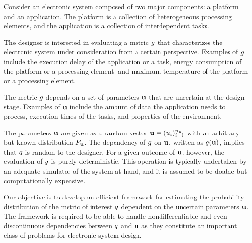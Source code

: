 Consider an electronic system composed of two major components: a platform and
an application. The platform is a collection of heterogeneous processing
elements, and the application is a collection of interdependent tasks.

The designer is interested in evaluating a metric $g$ that characterizes the
electronic system under consideration from a certain perspective. Examples of
$g$ include the execution delay of the application or a task, energy
consumption of the platform or a processing element, and maximum temperature of
the platform or a processing element.

The metric $g$ depends on a set of parameters $\mathbf{u}$ that are uncertain at the
design stage. Examples of $\mathbf{u}$ include the amount of data the application needs
to process, execution times of the tasks, and properties of the environment.

The parameters $\mathbf{u}$ are given as a random vector $\mathbf{u} = (u_i)_{i = 1}^{n_u}$
with an arbitrary but known distribution $F_{\mathbf{u}}$. The dependency of
$g$ on $\mathbf{u}$, written as $g(\mathbf{u})$, implies that $g$ is random to the
designer. For a given outcome of $\mathbf{u}$, however, the evaluation of $g$ is
purely deterministic. This operation is typically undertaken by an adequate
simulator of the system at hand, and it is assumed to be doable but
computationally expensive.

Our objective is to develop an efficient framework for estimating the
probability distribution of the metric of interest $g$ dependent on the
uncertain parameters $\mathbf{u}$. The framework is required to be able to handle
nondifferentiable and even discontinuous dependencies between $g$ and $\mathbf{u}$ as
they constitute an important class of problems for electronic-system design.
